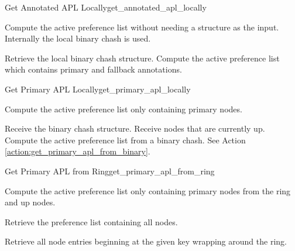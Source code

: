 \begin{actionbox}{Get Annotated APL Locally}{get_annotated_apl_locally}
	\begin{action}
		 Compute the active preference list without needing a structure as the input.
		Internally the local binary chash is used.
		\begin{action}
			 Retrieve the local binary chash structure.
			 Compute the active preference list which contains primary and fallback annotations.
		\end{action}
	\end{action}
\end{actionbox}

\begin{actionbox}{Get Primary APL Locally}{get_primary_apl_locally}
	\begin{action}
		 Compute the active preference list only containing primary nodes.
		\begin{action}
			 Receive the binary chash structure.
			 Receive nodes that are currently up.
			 Compute the active preference list from a binary chash.
			See Action \ref{action:get_primary_apl_from_binary}.
		\end{action}
	\end{action}
\end{actionbox}

\begin{actionbox}{Get Primary APL from Ring}{get_primary_apl_from_ring}
	\begin{action}
		 Compute the active preference list only containing primary nodes from the ring and up nodes.
		\begin{action}
			 Retrieve the preference list containing all nodes.
			\begin{action}
				 Retrieve all node entries beginning at the given key wrapping around the ring.
			\end{action}
		\end{action}
	\end{action}
\end{actionbox}

